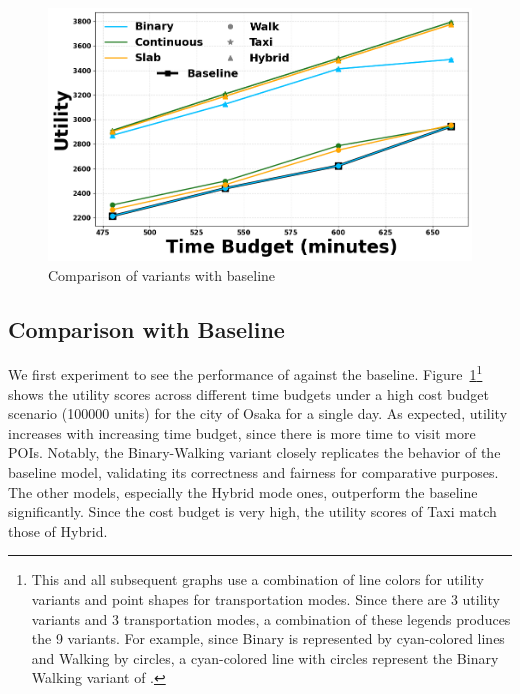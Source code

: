\begin{figure}[t]
\centering
\includegraphics[width=\columnwidth]{plots/baseline_singleDay.png}
\caption{Comparison of \trip variants with baseline}
\label{fig:baseline-single}
\end{figure}

\subsection{Comparison with Baseline}

We first experiment to see the performance of \trip against the baseline.
Figure~\ref{fig:baseline-single}\footnote{This and all subsequent graphs use a combination of line colors for utility variants and point shapes for transportation modes. Since there are 3 utility variants and 3 transportation modes, a combination of these legends produces the 9 \trip variants. For example, since Binary is represented by cyan-colored lines and Walking by circles, a cyan-colored line with circles represent the Binary Walking variant of \trip.}
shows the utility scores across different time budgets under a high cost budget scenario (100000 units) for the city of Osaka for a single day.
As expected, utility increases with increasing time budget, since there is more time to visit more POIs.
Notably, the \trip Binary-Walking variant closely replicates the behavior of the baseline model, validating its correctness and fairness for comparative purposes. The other models, especially the Hybrid mode ones, outperform the baseline significantly.
Since the cost budget is very high, the utility scores of Taxi match those of Hybrid.


